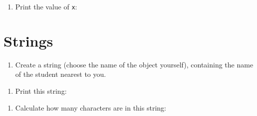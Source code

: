 \documentclass[
  letterpaper,
  DIV=11,
  numbers=noendperiod]{scrreprt}
\newenvironment{Shaded}{\begin{snugshade}}{\end{snugshade}}
\providecommand{\tightlist}{%
  \setlength{\itemsep}{0pt}\setlength{\parskip}{0pt}}
\begin{document}
\begin{Shaded}
\begin{Highlighting}[]

\end{Highlighting}
\end{Shaded}

\begin{enumerate}
\def\labelenumi{\arabic{enumi}.}
\setcounter{enumi}{6}
\tightlist
\item
  Print the value of \texttt{x}:
\end{enumerate}

\begin{Shaded}
\begin{Highlighting}[]

\end{Highlighting}
\end{Shaded}

\section{Strings}\label{strings-1}

\begin{enumerate}
\def\labelenumi{\arabic{enumi}.}
\setcounter{enumi}{7}
\tightlist
\item
  Create a string (choose the name of the object yourself), containing
  the name of the student nearest to you.
\end{enumerate}

\begin{Shaded}
\begin{Highlighting}[]

\end{Highlighting}
\end{Shaded}

\begin{enumerate}
\def\labelenumi{\arabic{enumi}.}
\setcounter{enumi}{8}
\tightlist
\item
  Print this string:
\end{enumerate}

\begin{Shaded}
\begin{Highlighting}[]

\end{Highlighting}
\end{Shaded}

\begin{enumerate}
\def\labelenumi{\arabic{enumi}.}
\setcounter{enumi}{9}
\tightlist
\item
  Calculate how many characters are in this string:
\end{enumerate}
\end{document}
